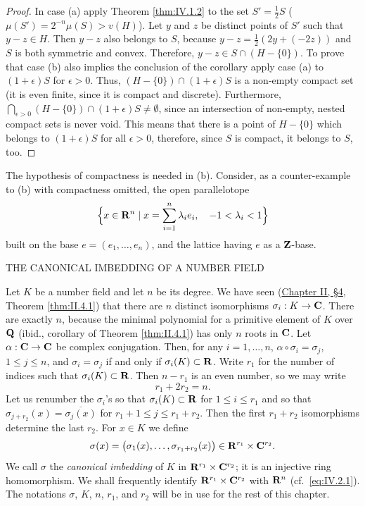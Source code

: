 \begin{proof}
In case (a) apply Theorem \ref{thm:IV.1.2} to the set $S'=\frac{1}{2}S$
($\mu(S')=2^{-n}\mu(S)>v(H)$). Let $y$ and $z$ be distinct points of $S'$
such that $y-z\in H$. Then $y-z$ also belongs to $S$, because
$y-z=\frac{1}{2}(2y+(-2z))$ and $S$ is both symmetric and convex. Therefore,
$y-z\in S\cap(H-\{0\})$. To prove that case (b) also implies the conclusion
of the corollary apply case (a) to $(1+\epsilon)S$ for $\epsilon>0$. Thus,
$(H-\{0\})\cap(1+\epsilon)S$ is a non-empty compact set (it is even finite,
since it is compact and discrete). Furthermore,
$\bigcap_{\epsilon>0}(H-\{0\})\cap(1+\epsilon)S\neq\emptyset$, since an
intersection of non-empty, nested compact sets is never void. This means
that there is a point of $H-\{0\}$ which belongs to $(1+\epsilon)S$ for all
$\epsilon>0$, therefore, since $S$ is compact, it belongs to $S$, too.
\end{proof}

The hypothesis of compactness is needed in (b). Consider, as a
counter-example to (b) with compactness omitted, the open parallelotope
\[
\Bigl\{x\in\mathbf{R}^{n}\mid x=\sum_{i=1}^{n}\lambda_{i}e_{i},\quad
-1<\lambda_{i}<1\Bigr\}
\]
built on the base $e=(e_{1},\ldots,e_{n})$, and the lattice having $e$ as a
$\mathbf{Z}$-base.

%
        {THE CANONICAL IMBEDDING OF A NUMBER FIELD}

Let $K$ be a number field and let $n$ be its degree. We have seen
(\hyperref[sec:2.4]{Chapter II, §4}, Theorem \ref{thm:II.4.1}) that there are $n$ distinct
isomorphisms $\sigma_{i}:K\to\mathbf{C}$. There are exactly $n$, because the
minimal polynomial for a primitive element of $K$ over $\mathbf{Q}$ (ibid.,
corollary of Theorem \ref{thm:II.4.1}) has only $n$ roots in $\mathbf{C}$. Let
$\alpha:\mathbf{C}\to\mathbf{C}$ be complex conjugation. Then, for any $i=1,\ldots,n$,
$\alpha\circ\sigma_{i}=\sigma_{j}$, $1\leq j\leq n$, and
$\sigma_{i}=\sigma_{j}$ if and only if $\sigma_{i}(K)\subset\mathbf{R}$. Write
$r_{1}$ for the number of indices such that $\sigma_{i}(K)\subset\mathbf{R}$. Then
$n-r_{1}$ is an even number, so we may write
\begin{equation}
r_{1}+2r_{2}=n.
\label{eq:IV.2.1}
\end{equation}
Let us renumber the $\sigma_{i}$'s so that $\sigma_{i}(K)\subset\mathbf{R}$ for
$1\leq i\leq r_{1}$ and so that
$\sigma_{j+r_{2}}(x)=\overline{\sigma_{j}(x)}$ for
$r_{1}+1\leq j\leq r_{1}+r_{2}$. Then the first $r_{1}+r_{2}$ isomorphisms
determine the last $r_{2}$. For $x\in K$ we define
\begin{equation}
\sigma(x)=\bigl(\sigma_{1}(x),\ldots,
\sigma_{r_{1}+r_{2}}(x)\bigr)\in\mathbf{R}^{r_{1}}\times\mathbf{C}^{r_{2}}.
\label{eq:IV.2.2}
\end{equation}
We call $\sigma$ the \emph{canonical imbedding} of $K$ in
$\mathbf{R}^{r_{1}}\times\mathbf{C}^{r_{2}}$; it is an injective ring homomorphism. We shall
frequently identify $\mathbf{R}^{r_{1}}\times\mathbf{C}^{r_{2}}$ with $\mathbf{R}^{n}$
(cf.\ \eqref{eq:IV.2.1}). The notations $\sigma$, $K$, $n$, $r_{1}$, and
$r_{2}$ will be in use for the rest of this chapter.

